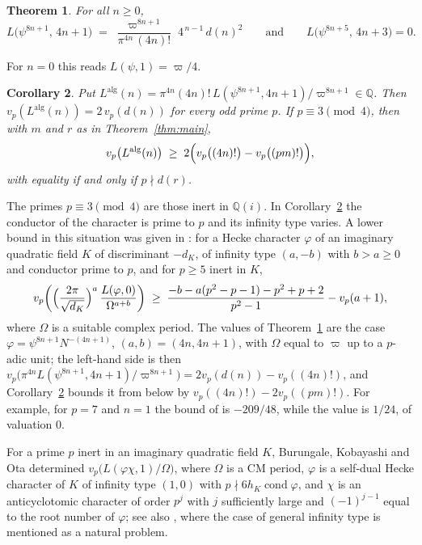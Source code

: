\documentclass[11pt]{amsart}
\newtheorem{theorem}{Theorem}[section]
\newtheorem{corollary}[theorem]{Corollary}
\theoremstyle{definition}
\theoremstyle{remark}
\newcommand{\Q}{\mathbb{Q}}
\begin{document}
\begin{theorem}\label{thm:Lvalue}
For all $n\ge0$,
\[
L\bigl(\psi^{8n+1},\,4n+1\bigr)\;=\;\frac{\varpi^{8n+1}}{\pi^{4n}\,(4n)!}\;4^{\,n-1}\,d(n)^2
\qquad\text{and}\qquad L\bigl(\psi^{8n+5},\,4n+3\bigr)=0 .
\]
\end{theorem}

For $n=0$ this reads $L(\psi,1)=\varpi/4$.

\begin{corollary}\label{cor:Lvalue}
Put $L^{\mathrm{alg}}(n)=\pi^{4n}(4n)!\,L(\psi^{8n+1},4n+1)/\varpi^{8n+1}\in\Q$. Then
$v_p(L^{\mathrm{alg}}(n))=2\,v_p(d(n))$ for every odd prime $p$. If $p\equiv3\pmod4$, then with
$m$ and $r$ as in Theorem~\ref{thm:main},
\[
v_p\bigl(L^{\mathrm{alg}}(n)\bigr)\;\ge\;2\Bigl(v_p\bigl((4n)!\bigr)-v_p\bigl((pm)!\bigr)\Bigr),
\]
with equality if and only if $p\nmid d(r)$.
\end{corollary}

The primes $p\equiv3\pmod4$ are those inert in $\Q(i)$. In Corollary~\ref{cor:Lvalue} the
conductor of the character is prime to $p$ and its infinity type varies. A lower bound in this
situation was given in \cite[Theorem~6.8]{BKY}: for a Hecke character $\varphi$ of an imaginary
quadratic field $K$ of discriminant $-d_K$, of infinity type $(a,-b)$ with $b>a\ge0$ and conductor
prime to $p$, and for $p\ge5$ inert in $K$,
\[
v_p\biggl(\Bigl(\frac{2\pi}{\sqrt{d_K}}\Bigr)^{a}\,\frac{L(\varphi,0)}{\Omega^{a+b}}\biggr)\;\ge\;
\frac{-b-a(p^2-p-1)-p^2+p+2}{p^2-1}-v_p(a+1),
\]
where $\Omega$ is a suitable complex period. The values of Theorem~\ref{thm:Lvalue} are the case
$\varphi=\psi^{8n+1}N^{-(4n+1)}$, $(a,b)=(4n,4n+1)$, with $\Omega$ equal to $\varpi$ up to a
$p$-adic unit; the left-hand side is then
$v_p\bigl(\pi^{4n}L(\psi^{8n+1},4n+1)/\varpi^{8n+1}\bigr)=2v_p(d(n))-v_p((4n)!)$, and
Corollary~\ref{cor:Lvalue} bounds it from below by $v_p((4n)!)-2v_p((pm)!)$. For example, for $p=7$
and $n=1$ the bound of \cite{BKY} is $-209/48$, while the value is $1/24$, of valuation $0$.

For a prime $p$ inert
in an imaginary quadratic field $K$, Burungale, Kobayashi and Ota \cite[Theorem~5.3]{BKO}
determined $v_p\bigl(L(\varphi\chi,1)/\Omega\bigr)$, where $\Omega$ is a CM period, $\varphi$ is a
self-dual Hecke character of $K$ of infinity type $(1,0)$ with
$p\nmid6h_K\operatorname{cond}\varphi$, and $\chi$ is an anticyclotomic character of order $p^j$
with $j$ sufficiently large and $(-1)^{j-1}$ equal to the root number of $\varphi$; see also
\cite{BHKO}, where the case of general infinity type is mentioned as a natural problem.
\end{document}
